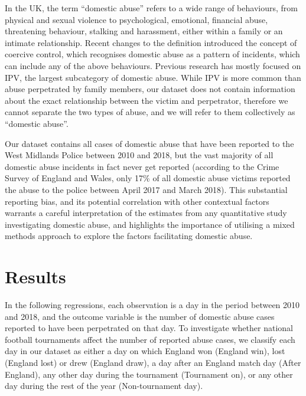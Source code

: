 \documentclass[12pt, letterpaper]{article}
\begin{document}
In the UK, the term ``domestic abuse'' refers to a wide range of behaviours, from physical and sexual violence to psychological, emotional, financial abuse, threatening behaviour, stalking and harassment, either within a family or an intimate relationship\autocite{ONS}. Recent changes to the definition introduced the concept of coercive control, which recognises domestic abuse as a pattern of incidents, which can include any of the above behaviours. Previous research has mostly focused on IPV, the largest subcategory of domestic abuse. While IPV is more common than abuse perpetrated by family members\autocite{ONS}, our dataset does not contain information about the exact relationship between the victim and perpetrator, therefore we cannot separate the two types of abuse, and we will refer to them collectively as ``domestic abuse''.


Our dataset contains all cases of domestic abuse that have been reported to the West Midlands Police between 2010 and 2018, but the vast majority of all domestic abuse incidents in fact never get reported (according to the Crime Survey of England and Wales, only 17\% of all domestic abuse victims reported the abuse to the police between April 2017 and March 2018\autocite{ONS}). This substantial reporting bias, and its potential correlation with other contextual factors warrants a careful interpretation of the estimates from any quantitative study investigating domestic abuse, and highlights the importance of utilising a mixed methods approach to explore the factors facilitating domestic abuse. 


\newpage



\section*{Results}

In the following regressions, each observation is a day in the period between 2010 and 2018, and the outcome variable is the number of domestic abuse cases reported to have been perpetrated on that day. To investigate whether national football tournaments affect the number of reported abuse cases, we classify each day in our dataset as either a day on which England won (England win), lost (England lost) or drew (England draw), a day after an England match day (After England), any other day during the tournament (Tournament on), or any other day during the rest of the year (Non-tournament day). 
\end{document}
